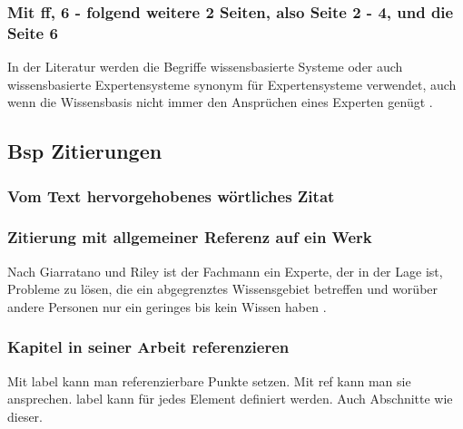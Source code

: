 \subsubsection{Mit ff, 6 - folgend weitere 2 Seiten, also Seite 2 - 4, und die Seite 6}
In der Literatur werden die Begriffe wissensbasierte Systeme oder auch wissensbasierte Expertensysteme synonym für Expertensysteme verwendet, auch wenn die Wissensbasis nicht immer den Ansprüchen eines Experten genügt \cite[\vgl][S. 2 ff, 6]{GiarratanoRiley:1989}. 


\subsection{Bsp Zitierungen}

\subsubsection{Vom Text hervorgehobenes wörtliches Zitat}

\subsubsection{Zitierung mit allgemeiner Referenz auf ein Werk}
Nach Giarratano und Riley ist der Fachmann ein Experte, der in der Lage ist, Probleme zu lösen, die ein abgegrenztes Wissensgebiet betreffen und worüber andere Personen nur ein geringes bis kein Wissen haben \citep[\vgl][]{GiarratanoRiley:1989}. \\

\subsubsection{Kapitel in seiner Arbeit referenzieren}
\label{sec:referenzabschnitt}
Mit label kann man referenzierbare Punkte setzen. Mit ref kann man sie ansprechen. label kann für jedes Element definiert werden. Auch Abschnitte wie dieser.\\

